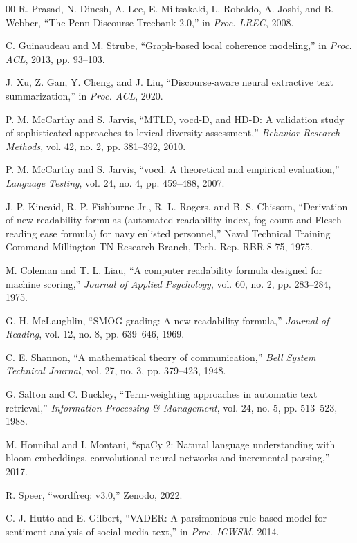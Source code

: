 \documentclass[conference]{IEEEtran}
\begin{document}
\begin{thebibliography}{00}
 R. Prasad, N. Dinesh, A. Lee, E. Miltsakaki, L. Robaldo, A. Joshi, and B. Webber, ``The Penn Discourse Treebank 2.0,'' in \emph{Proc. LREC}, 2008.

 C. Guinaudeau and M. Strube, ``Graph-based local coherence modeling,'' in \emph{Proc. ACL}, 2013, pp. 93--103.

 J. Xu, Z. Gan, Y. Cheng, and J. Liu, ``Discourse-aware neural extractive text summarization,'' in \emph{Proc. ACL}, 2020.

 P. M. McCarthy and S. Jarvis, ``MTLD, vocd-D, and HD-D: A validation study of sophisticated approaches to lexical diversity assessment,'' \emph{Behavior Research Methods}, vol. 42, no. 2, pp. 381--392, 2010.

 P. M. McCarthy and S. Jarvis, ``vocd: A theoretical and empirical evaluation,'' \emph{Language Testing}, vol. 24, no. 4, pp. 459--488, 2007.

 J. P. Kincaid, R. P. Fishburne Jr., R. L. Rogers, and B. S. Chissom, ``Derivation of new readability formulas (automated readability index, fog count and Flesch reading ease formula) for navy enlisted personnel,'' Naval Technical Training Command Millington TN Research Branch, Tech. Rep. RBR-8-75, 1975.

 M. Coleman and T. L. Liau, ``A computer readability formula designed for machine scoring,'' \emph{Journal of Applied Psychology}, vol. 60, no. 2, pp. 283--284, 1975.

 G. H. McLaughlin, ``SMOG grading: A new readability formula,'' \emph{Journal of Reading}, vol. 12, no. 8, pp. 639--646, 1969.

 C. E. Shannon, ``A mathematical theory of communication,'' \emph{Bell System Technical Journal}, vol. 27, no. 3, pp. 379--423, 1948.

 G. Salton and C. Buckley, ``Term-weighting approaches in automatic text retrieval,'' \emph{Information Processing \& Management}, vol. 24, no. 5, pp. 513--523, 1988.

 M. Honnibal and I. Montani, ``spaCy 2: Natural language understanding with bloom embeddings, convolutional neural networks and incremental parsing,'' 2017.

 R. Speer, ``wordfreq: v3.0,'' Zenodo, 2022.

 C. J. Hutto and E. Gilbert, ``VADER: A parsimonious rule-based model for sentiment analysis of social media text,'' in \emph{Proc. ICWSM}, 2014.


\end{thebibliography}
\end{document}
